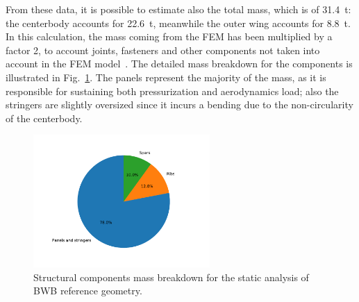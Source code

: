 From these data, it is possible to estimate also the total mass, which is of 31.4~\si{\tonne}: the centerbody accounts for 22.6~\si{\tonne}, meanwhile the outer wing accounts for 8.8~\si{\tonne}. 
In this calculation, the mass coming from the FEM has been multiplied by a factor 2, to account joints, fasteners and other components not taken into account in the FEM model~\cite{bib:mukhopadhyay_1996, bib:mukhopadhayay_2004}. 
The detailed mass breakdown for the components is illustrated in Fig.~\ref{fig:bwb_static_analysis_res_mb}.
The panels represent the majority of the mass, as it is responsible for sustaining both pressurization and aerodynamics load; also the stringers are slightly oversized since it incurs a bending due to the non-circularity of the centerbody. 
\begin{figure}[!h]
	\centering
	\includegraphics[keepaspectratio, width=0.6\textwidth]{images/chap4/bwb_internal_structure_breakdown}
	\caption{Structural components mass breakdown for the static analysis of BWB reference geometry.}
	\label{fig:bwb_static_analysis_res_mb}
\end{figure}


